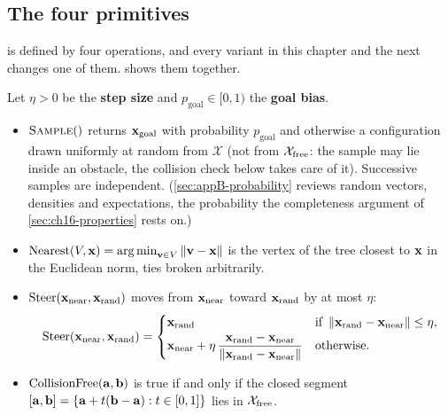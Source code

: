 \subsection{The four primitives}
\label{sec:ch16-primitives}

\rrt is defined by four operations, and every variant in this chapter and the
next changes one of them.  shows them together.

\begin{definition}
\label{def:ch16-primitives}
Let $\eta>0$ be the \textbf{step size} and
$p_{\mathrm{goal}}\in[0,1)$ the \textbf{goal bias}.
\begin{itemize}
  \item $\textsc{Sample}()$ returns $\mathbf{x}_{\mathrm{goal}}$ with probability
        $p_{\mathrm{goal}}$ and otherwise a configuration drawn uniformly at random
        from $\mathcal{X}$ (not from $\mathcal{X}_{\mathrm{free}}$: the sample may lie inside an obstacle,
        the collision check below takes care of it). Successive samples are
        independent. (\cref{sec:appB-probability} reviews random vectors,
        densities and expectations, the probability the completeness argument
        of \cref{sec:ch16-properties} rests on.)
  \item $\operatorname{Nearest}(V,\mathbf{x})=\operatorname*{arg\,min}_{\mathbf{v}\in V}\left\lVert \mathbf{v}-\mathbf{x} \right\rVert$ is the vertex of the
        tree closest to $\mathbf{x}$ in the Euclidean norm, ties broken arbitrarily.
  \item $\operatorname{Steer}(\mathbf{x}_{\mathrm{near}},\mathbf{x}_{\mathrm{rand}})$ moves from
        $\mathbf{x}_{\mathrm{near}}$ toward $\mathbf{x}_{\mathrm{rand}}$ by at most $\eta$:
        \begin{equation}
        \operatorname{Steer}(\mathbf{x}_{\mathrm{near}},\mathbf{x}_{\mathrm{rand}})=
        \begin{cases}
          \mathbf{x}_{\mathrm{rand}} & \text{if } \left\lVert \mathbf{x}_{\mathrm{rand}}-\mathbf{x}_{\mathrm{near}} \right\rVert\le\eta,\\[2pt]
          \mathbf{x}_{\mathrm{near}}+\eta\,\dfrac{\mathbf{x}_{\mathrm{rand}}-\mathbf{x}_{\mathrm{near}}}{\left\lVert \mathbf{x}_{\mathrm{rand}}-\mathbf{x}_{\mathrm{near}} \right\rVert} & \text{otherwise.}
        \end{cases}
        \label{eq:ch16-steer}
        \end{equation}
  \item $\operatorname{CollisionFree}(\mathbf{a},\mathbf{b})$ is true if and only if the closed
        segment $[\mathbf{a},\mathbf{b}]=\left\{ \mathbf{a}+t(\mathbf{b}-\mathbf{a}): t\in[0,1] \right\}$ lies in $\mathcal{X}_{\mathrm{free}}$.
\end{itemize}
\end{definition}

